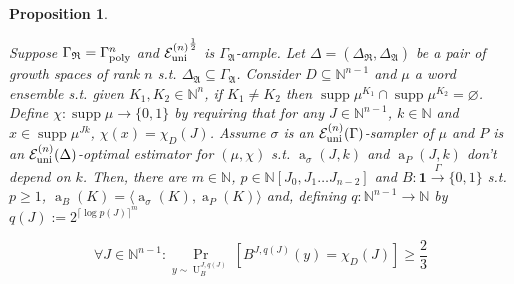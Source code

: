 \documentclass{article}
\numberwithin{equation}{section}
\theoremstyle{definition}
\theoremstyle{plain}
\newtheorem{proposition}{Proposition}[section]
\newcommand{\Bool}{\{0,1\}}
\DeclareMathOperator{\Supp}{supp}
\DeclareMathOperator{\Prb}{Pr}
\DeclareMathOperator{\A}{a}
\DeclareMathOperator{\Un}{U}
\newcommand{\Nats}{\mathbb{N}}
\newcommand{\NatPolyJ}{\Nats[J_0, J_1 \ldots J_{n-2}]}
\newcommand{\Ceil}[1]{\lceil #1 \rceil}
\newcommand{\Chev}[1]{\langle #1 \rangle}
\newcommand{\GrowR}{\Gamma_{\mathfrak{R}}}
\newcommand{\GrowA}{\Gamma_{\mathfrak{A}}}
\newcommand{\Fall}{\mathcal{E}}
\newcommand{\GammaPoly}{\Gamma_{\textnormal{poly}}}
\newcommand{\FallU}{{\Fall_{\textnormal{uni}}^{(n)}}}
\newcommand{\Scheme}{\xrightarrow{\Gamma}}
\begin{document}
\begin{samepage}
\begin{proposition}
\label{prp:tally_fall_uni}

Suppose ${\GrowR  = \GammaPoly^n}$ and ${\FallU^{\frac{1}{2}}}$ is ${\GrowA}$-ample. Let ${\Delta=(\Delta_{\mathfrak{R}}, \Delta_{\mathfrak{A}})}$ be a pair of growth spaces of rank ${n}$ s.t. ${\Delta_{\mathfrak{A}} \subseteq \GrowA}$. Consider ${D \subseteq \Nats^{n-1}}$ and ${\mu}$ a word ensemble s.t. given ${K_1, K_2 \in \Nats^n}$, if ${K_1 \ne K_2}$ then ${\Supp \mu^{K_1} \cap \Supp \mu^{K_2} = \varnothing}$. Define ${\chi: \Supp \mu \rightarrow \Bool}$ by requiring that for any ${J \in \Nats^{n-1}}$, ${k \in \Nats}$ and ${x \in \Supp \mu^{Jk}}$, ${\chi(x)=\chi_D(J)}$. Assume ${\sigma}$ is an ${\FallU(\Gamma)}$-sampler of ${\mu}$ and ${P}$ is an ${\FallU(\Delta)}$-optimal estimator for ${(\mu, \chi)}$ s.t. ${\A_\sigma(J,k)}$ and ${\A_P(J,k)}$ don't depend on ${k}$. Then, there are $m \in \Nats$, ${p \in \NatPolyJ}$ and ${B: \bm{1} \Scheme \Bool}$ s.t. ${p \geq 1}$, ${\A_B(K)=\Chev{\A_\sigma(K),\A_P(K)}}$ and, defining ${q: \Nats^{n-1} \rightarrow \Nats}$ by ${q(J):=2^{\Ceil{\log p(J)}^m}}$

\begin{equation}
\forall J \in \Nats^{n-1}:\Prb_{y \sim \Un_B^{J,q(J)}}[B^{J,q(J)}(y)=\chi_D(J)] \geq \frac{2}{3}
\end{equation}

\end{proposition}
\end{samepage}
\end{document}
